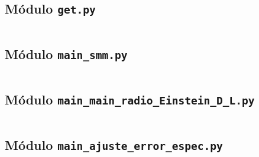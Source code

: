 \subsection{Módulo \texttt{get.py}}\label{apendice:codigo:get}

\inputminted{python}{Apendices/codigo/get.py}


\subsection{Módulo \texttt{main\_smm.py}}\label{apendice:codigo:main_smm}

\inputminted{python}{Apendices/codigo/main_smm.py}


\subsection{Módulo \texttt{main\_main\_radio\_Einstein\_D\_L.py}}\label{apendice:codigo:main_radio_Einstein_D_L}

\inputminted{python}{Apendices/codigo/main_radio_Einstein_D_L.py}


\subsection{Módulo \texttt{main\_ajuste\_error\_espec.py}}\label{apendice:codigo:main_ajuste_error_espec}

\inputminted{python}{Apendices/codigo/main_ajuste_error_espec.py}